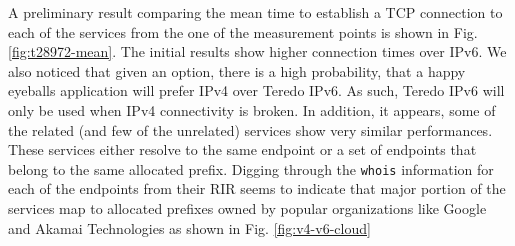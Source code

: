 
A preliminary result comparing the mean time to establish a TCP connection to
each of the services from the one of the measurement points is shown in Fig.
\ref{fig:t28972-mean}. The initial results show higher connection times over
IPv6. We also noticed that given an option, there is a high probability, that
a happy eyeballs application will prefer IPv4 over Teredo IPv6. As such,
Teredo IPv6 will only be used when IPv4 connectivity is broken. In addition,
it appears, some of the related (and few of the unrelated) services show very
similar performances.  These services either resolve to the same endpoint or a
set of endpoints that belong to the same allocated prefix.  Digging through
the \texttt{whois} information for each of the endpoints from their \ac{RIR}
seems to indicate that major portion of the services map to allocated prefixes
owned by popular organizations like Google and Akamai Technologies as shown in
Fig.  \ref{fig:v4-v6-cloud}


